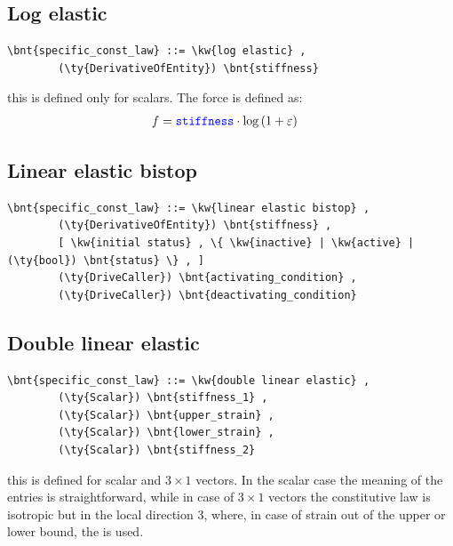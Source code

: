 \subsection{Log elastic}
\begin{Verbatim}[commandchars=\\\{\}]
    \bnt{specific_const_law} ::= \kw{log elastic} ,
        (\ty{DerivativeOfEntity}) \bnt{stiffness}
\end{Verbatim}
this is defined only for scalars. The force is defined as:
\begin{align}
    f &= \textcolor{blue}{\texttt{stiffness}} \cdot \mathrm{log}\left( 1 + \varepsilon \right)
\end{align}
  
\subsection{Linear elastic bistop}
\begin{Verbatim}[commandchars=\\\{\}]
    \bnt{specific_const_law} ::= \kw{linear elastic bistop} ,
        (\ty{DerivativeOfEntity}) \bnt{stiffness} ,
        [ \kw{initial status} , \{ \kw{inactive} | \kw{active} | (\ty{bool}) \bnt{status} \} , ]
        (\ty{DriveCaller}) \bnt{activating_condition} ,
        (\ty{DriveCaller}) \bnt{deactivating_condition}
\end{Verbatim}
  
\subsection{Double linear elastic}
\begin{Verbatim}[commandchars=\\\{\}]
    \bnt{specific_const_law} ::= \kw{double linear elastic} ,
        (\ty{Scalar}) \bnt{stiffness_1} ,
        (\ty{Scalar}) \bnt{upper_strain} ,
        (\ty{Scalar}) \bnt{lower_strain} ,
        (\ty{Scalar}) \bnt{stiffness_2}
\end{Verbatim}
this is defined for scalar and $3 \times 1$ vectors. In the scalar case the
meaning of the entries is straightforward,
while in case of $3 \times 1$ vectors the constitutive law is isotropic
but in the local direction 3, where, in case of strain
out of the upper or lower bound, the  is used.

